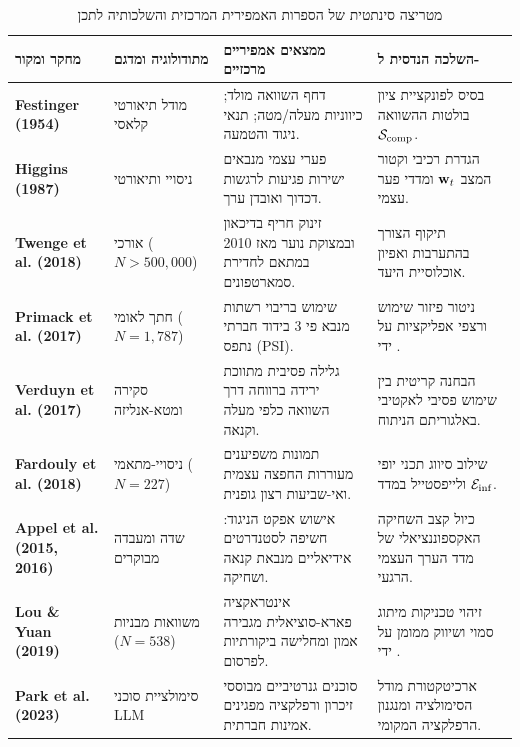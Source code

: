 \begin{table}[H]
\centering
\caption{מטריצה סינתטית של הספרות האמפירית המרכזית והשלכותיה לתכן \projectname{}}
\label{tab:empirical_literature_matrix}
\footnotesize
\renewcommand{\arraystretch}{0.88}
\begin{tabularx}{\textwidth}{>{\bfseries\raggedleft\arraybackslash}p{2.6cm} >{\raggedleft\arraybackslash}p{2.3cm} >{\raggedleft\arraybackslash}p{4.2cm} X}
\toprule
\rowcolor{LavenderCard}
\textbf{\color{DarkPurple}מחקר ומקור} & \textbf{\color{DarkPurple}מתודולוגיה ומדגם} & \textbf{\color{DarkPurple}ממצאים אמפיריים מרכזיים} & \textbf{\color{DarkPurple}השלכה הנדסית ל-\projectname{}} \\
\midrule
\textbf{\textenglish{Festinger (1954)}}~\cite{festinger1954theory} & מודל תיאורטי קלאסי & דחף השוואה מולד; כיווניות מעלה/מטה; תנאי ניגוד והטמעה. & בסיס לפונקציית ציון בולטות ההשוואה $\mathcal{S}_{\text{comp}}{}$. \\
\midrule
\textbf{\textenglish{Higgins (1987)}}~\cite{higgins1987self} & ניסויי ותיאורטי & פערי עצמי מנבאים ישירות פגיעות לרגשות דכדוך ואובדן ערך. & הגדרת רכיבי וקטור המצב $\mathbf{w}_t{}$ ומדדי פער עצמי. \\
\midrule
\textbf{\textenglish{Twenge et al. (2018)}}~\cite{twenge2018increases} & אורכי ($N > 500{,}000$) & זינוק חריף בדיכאון ובמצוקת נוער מאז 2010 במתאם לחדירת סמארטפונים. & תיקוף הצורך בהתערבות ואפיון אוכלוסיית היעד. \\
\midrule
\textbf{\textenglish{Primack et al. (2017)}}~\cite{primack2017social} & חתך לאומי ($N = 1{,}787$) & שימוש בריבוי רשתות מנבא פי 3 בידוד חברתי נתפס (\textenglish{PSI}). & ניטור פיזור שימוש ורצפי אפליקציות על ידי \agentObserver{}. \\
\midrule
\textbf{\textenglish{Verduyn et al. (2017)}}~\cite{verduyn2017social} & סקירה ומטא-אנליזה & גלילה פסיבית מתווכת ירידה ברווחה דרך השוואה כלפי מעלה וקנאה. & הבחנה קריטית בין שימוש פסיבי לאקטיבי באלגוריתם הניתוח. \\
\midrule
\textbf{\textenglish{Fardouly et al. (2018)}}~\cite{fardouly2018instagram} & ניסויי-מתאמי ($N = 227$) & תמונות משפיענים מעוררות החפצה עצמית ואי-שביעות רצון גופנית. & שילוב סיווג תכני יופי ולייפסטייל במדד $\mathcal{E}_{\text{inf}}{}$. \\
\midrule
\textbf{\textenglish{Appel et al. (2015, 2016)}}~\cite{appel2015social, appel2016interplay} & שדה ומעבדה מבוקרים & אישוש אפקט הניגוד: חשיפה לסטנדרטים אידיאליים מנבאת קנאה ושחיקה. & כיול קצב השחיקה האקספוננציאלי של מדד הערך העצמי הרגעי. \\
\midrule
\textbf{\textenglish{Lou \& Yuan (2019)}}~\cite{lou2019influencer} & משוואות מבניות ($N = 538$) & אינטראקציה פארא-סוציאלית מגבירה אמון ומחלישה ביקורתיות לפרסום. & זיהוי טכניקות מיתוג סמוי ושיווק ממומן על ידי \agentAnalyst{}. \\
\midrule
\textbf{\textenglish{Park et al. (2023)}}~\cite{park2023generative} & סימולציית סוכני LLM & סוכנים גנרטיביים מבוססי זיכרון ורפלקציה מפגינים אמינות חברתית. & ארכיטקטורת מודל הסימולציה ומנגנון הרפלקציה המקומי. \\
\bottomrule
\end{tabularx}
\end{table}

